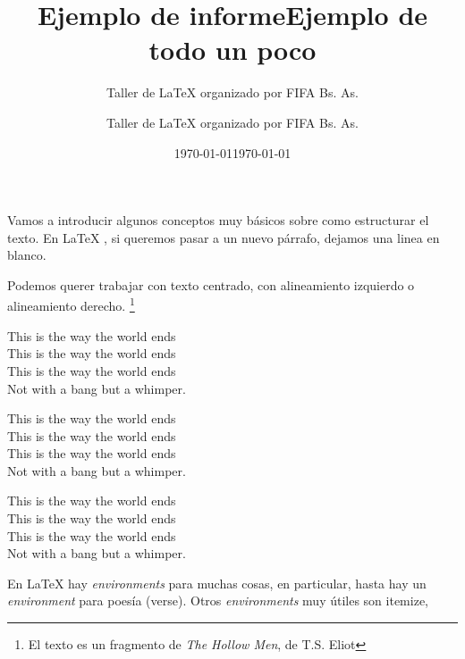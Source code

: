 \documentclass[12pt,a4paper]{article}
\title{Ejemplo de informe}
\author{Taller de \LaTeX{} organizado por FIFA Bs. As.}
\date{\today} %
\title{Ejemplo de todo un poco}
\author{Taller de \LaTeX{} organizado por FIFA Bs. As.}
\date{\today}
\begin{document}
  


\maketitle

\tableofcontents  %
\clearpage

Vamos a introducir algunos conceptos muy básicos sobre como estructurar el texto. En \LaTeX{} , si queremos pasar a un nuevo párrafo, dejamos una linea en blanco.

Podemos querer trabajar con texto centrado, con alineamiento izquierdo o alineamiento derecho. \footnote{El texto es un fragmento de \textit{The Hollow Men}, de T.S. Eliot} %

\begin{center}
This is the way the world ends \\ %
This is the way the world ends \\
This is the way the world ends \\
Not with a bang but a whimper. 
\end{center}

\begin{flushright}
 This is the way the world ends \\ 
This is the way the world ends \\
This is the way the world ends \\
Not with a bang but a whimper. 
\end{flushright}

\begin{flushleft}
This is the way the world ends \\ 
This is the way the world ends \\
This is the way the world ends \\
Not with a bang but a whimper. 
\end{flushleft}

En \LaTeX{}  hay \textit{environments} para muchas cosas, en particular, hasta hay un \textit{environment} para poesía (verse). Otros  \textit{environments} muy útiles son itemize,
\end{document}
